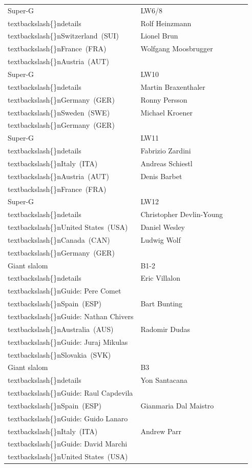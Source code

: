 \documentclass{article}
\begin{document}
\begin{tabular}{lllll}
Super-G & LW6/8\\textbackslash\{\}ndetails & Rolf Heinzmann\\textbackslash\{\}nSwitzerland (SUI) & Lionel Brun\\textbackslash\{\}nFrance (FRA) & Wolfgang Moosbrugger\\textbackslash\{\}nAustria (AUT) \\
Super-G & LW10\\textbackslash\{\}ndetails & Martin Braxenthaler\\textbackslash\{\}nGermany (GER) & Ronny Persson\\textbackslash\{\}nSweden (SWE) & Michael Kroener\\textbackslash\{\}nGermany (GER) \\
Super-G & LW11\\textbackslash\{\}ndetails & Fabrizio Zardini\\textbackslash\{\}nItaly (ITA) & Andreas Schiestl\\textbackslash\{\}nAustria (AUT) & Denis Barbet\\textbackslash\{\}nFrance (FRA) \\
Super-G & LW12\\textbackslash\{\}ndetails & Christopher Devlin-Young\\textbackslash\{\}nUnited States (USA) & Daniel Wesley\\textbackslash\{\}nCanada (CAN) & Ludwig Wolf\\textbackslash\{\}nGermany (GER) \\
Giant slalom & B1-2\\textbackslash\{\}ndetails & Eric Villalon\\textbackslash\{\}nGuide: Pere Comet\\textbackslash\{\}nSpain (ESP) & Bart Bunting\\textbackslash\{\}nGuide: Nathan Chivers\\textbackslash\{\}nAustralia (AUS) & Radomir Dudas\\textbackslash\{\}nGuide: Juraj Mikulas\\textbackslash\{\}nSlovakia (SVK) \\
Giant slalom & B3\\textbackslash\{\}ndetails & Yon Santacana\\textbackslash\{\}nGuide: Raul Capdevila\\textbackslash\{\}nSpain (ESP) & Gianmaria Dal Maistro\\textbackslash\{\}nGuide: Guido Lanaro\\textbackslash\{\}nItaly (ITA) & Andrew Parr\\textbackslash\{\}nGuide: David Marchi\\textbackslash\{\}nUnited States (USA) \\

\end{tabular}
\end{document}
